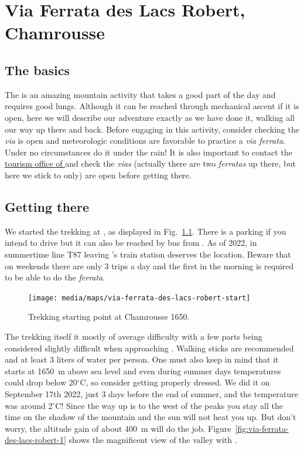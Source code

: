 \chapter{\label{ch:via-ferrata-lacs-robert}Via Ferrata des Lacs Robert, Chamrousse}

\section*{The basics}

The  is an amazing mountain activity that takes a good part of the day and requires good lungs. Although it can be reached through  mechanical ascent if it is open, here we will describe our adventure exactly as we have done it, walking all our way up there and back. Before engaging in this activity, consider checking the \emph{via} is open and meteorologic conditions are favorable to practice a \emph{via ferrata}. Under no circumstances do it under the rain! It is also important to contact the \href{https://www.chamrousse.com/plan-via-ferratas.html}{tourism office of } and check the \emph{vias} (actually there are two \emph{ferratas} up there, but here we stick to  only) are open before getting there.

\section*{Getting there}

We started the trekking at , as displayed in Fig.~\ref{fig:map-ferrata-des-lacs-robert-start}. There is a parking if you intend to drive but it can also be reached by bus from . As of 2022, in summertime line T87 leaving 's train station deserves the location. Beware that on weekends there are only 3 trips a day and the first in the morning is required to be able to do the \emph{ferrata}. 

\begin{figure}[!h]
\centering%
\texttt{[image: media/maps/via-ferrata-des-lacs-robert-start]}
\caption{\label{fig:map-ferrata-des-lacs-robert-start}Trekking starting point at Chamrousse 1650.}
\end{figure}

The trekking itself it mostly of average difficulty with a few parts being considered slightly difficult when approaching . Walking sticks are recommended and at least 3 liters of water per person. One must also keep in mind that it starts at 1650~m above sea level and even during summer days temperatures could drop below 20$^\circ$C, so consider getting properly dressed. We did it on September 17th 2022, just 3 days before the end of summer, and the temperature was around 2$^\circ$C! Since the way up is to the west of the peaks you stay all the time on the shadow of the mountain and the sun will not heat you up. But don't worry, the altitude gain of about 400~m will do the job. Figure~\ref{fig:via-ferrata-des-lacs-robert-1} shows the magnificent view of the valley with .

